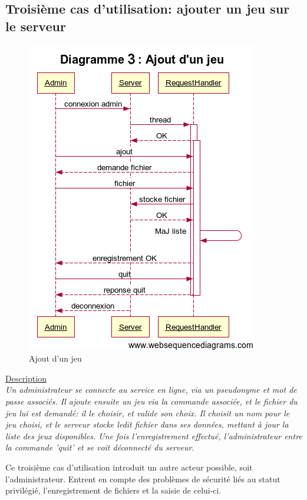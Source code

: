 	\subsection{Troisième cas d'utilisation: ajouter un jeu sur le serveur}
	\begin{figure}[!ht]
		\center
		\includegraphics[scale=0.7]{images/sequence/diagramme_ajout.png}
		\caption{Ajout d'un jeu}
	\end{figure}
	
	\underline{Description}\\
	
	\textit{Un administrateur se connecte au service en ligne, via un pseudonyme et mot de passe associés. Il ajoute ensuite un jeu via la commande associée, et le fichier du jeu lui est demandé: il le choisir, et valide son choix. Il choisit un nom pour le jeu choisi, et le serveur stocke ledit fichier dans ses données, mettant  à jour la liste des jeux disponibles. Une fois l'enregistrement effectué, l'administrateur entre la commande 'quit' et se voit déconnecté du serveur.}\\
	
	\vspace{3em}
	
	Ce troisième cas d'utilisation introduit un autre acteur possible, soit l'administrateur. Entrent en compte des problèmes de sécurité liés au statut privilégié, l'enregistrement de fichiers et la saisie de celui-ci.
	\newpage
	
